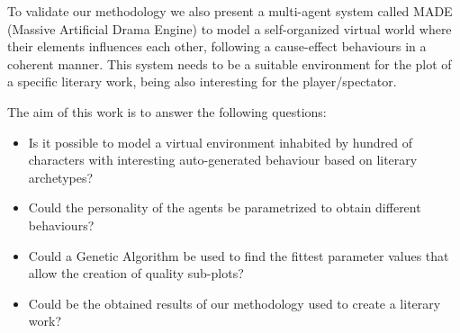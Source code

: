 \documentclass{sig-alternate}
\begin{document}










To validate our methodology we also present a multi-agent system called
MADE (Massive Artificial Drama Engine) to model a self-organized
virtual world where their elements influences each other, following a
cause-effect behaviours in a coherent manner. This system needs to be
a suitable environment for the plot of a specific literary work, being
also interesting for the player/spectator. 

The aim of this work is to answer the following questions:

\begin{itemize}
 \item Is it possible to model a virtual environment inhabited by hundred of characters with interesting auto-generated behaviour based on literary archetypes?
 \item Could the personality of the agents be parametrized to obtain different behaviours?
 \item Could a Genetic Algorithm be used to find the fittest parameter values that allow the creation of quality sub-plots?
 \item Could be the obtained results of our methodology used to create a literary work? %
\end{itemize}

\end{document}
